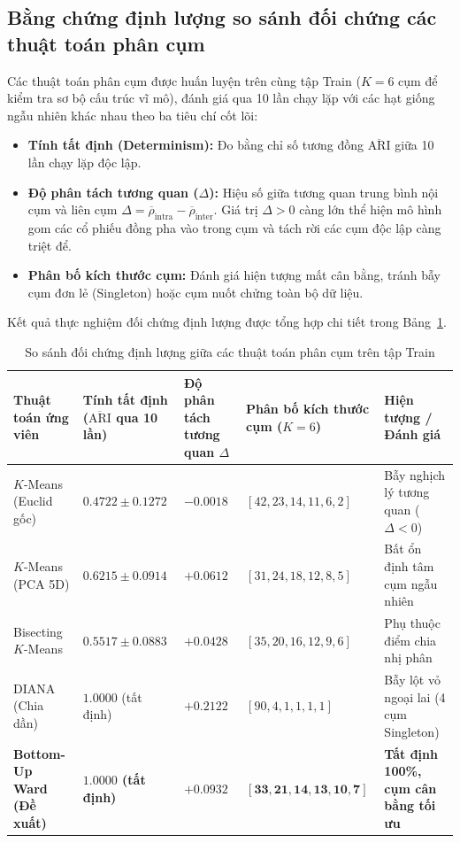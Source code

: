 \documentclass[12pt,a4paper,oneside,openany]{report}
\renewcommand{\arraystretch}{1.25}
\begin{document}
\subsection{Bằng chứng định lượng so sánh đối chứng các thuật toán phân cụm}
Các thuật toán phân cụm được huấn luyện trên cùng tập Train ($K=6$ cụm để kiểm tra sơ bộ cấu trúc vĩ mô), đánh giá qua 10 lần chạy lặp với các hạt giống ngẫu nhiên khác nhau theo ba tiêu chí cốt lõi:
\begin{itemize}
  \item \textbf{Tính tất định (Determinism):} Đo bằng chỉ số tương đồng $\overline{\text{ARI}}$ giữa 10 lần chạy lặp độc lập.
  \item \textbf{Độ phân tách tương quan ($\Delta$):} Hiệu số giữa tương quan trung bình nội cụm và liên cụm $\Delta = \overline{\rho}_{\text{intra}} - \overline{\rho}_{\text{inter}}$. Giá trị $\Delta > 0$ càng lớn thể hiện mô hình gom các cổ phiếu đồng pha vào trong cụm và tách rời các cụm độc lập càng triệt để.
  \item \textbf{Phân bố kích thước cụm:} Đánh giá hiện tượng mất cân bằng, tránh bẫy cụm đơn lẻ (Singleton) hoặc cụm nuốt chửng toàn bộ dữ liệu.
\end{itemize}

Kết quả thực nghiệm đối chứng định lượng được tổng hợp chi tiết trong Bảng~\ref{tab:sosanh_3_truongphai}.

\begingroup
\small
\renewcommand{\arraystretch}{1.2}
\begin{table}[H]
  \centering
  \caption{So sánh đối chứng định lượng giữa các thuật toán phân cụm trên tập Train}
  \label{tab:sosanh_3_truongphai}
  \begin{tabularx}{\textwidth}{|p{3.2cm}|>{\centering\arraybackslash}p{2.2cm}|>{\centering\arraybackslash}p{2.2cm}|X|>{\centering\arraybackslash}p{1.8cm}|}
    \hline
    \rowcolor{black!8}\textbf{Thuật toán ứng viên} & \textbf{Tính tất định ($\overline{\text{ARI}}$ qua 10 lần)} & \textbf{Độ phân tách tương quan $\Delta$} & \textbf{Phân bố kích thước cụm ($K=6$)} & \textbf{Hiện tượng / Đánh giá} \\ \hline
    $K$-Means (Euclid gốc) & $0.4722 \pm 0.1272$ & $-0.0018$ & $[42, 23, 14, 11, 6, 2]$ & Bẫy nghịch lý tương quan ($\Delta < 0$) \\ \hline
    $K$-Means (PCA 5D) & $0.6215 \pm 0.0914$ & $+0.0612$ & $[31, 24, 18, 12, 8, 5]$ & Bất ổn định tâm cụm ngẫu nhiên \\ \hline
    Bisecting $K$-Means & $0.5517 \pm 0.0883$ & $+0.0428$ & $[35, 20, 16, 12, 9, 6]$ & Phụ thuộc điểm chia nhị phân \\ \hline
    DIANA (Chia dần) & $1.0000$ (tất định) & $+0.2122$ & $[90, 4, 1, 1, 1, 1]$ & Bẫy lột vỏ ngoại lai (4 cụm Singleton) \\ \hline
    \textbf{Bottom-Up Ward (Đề xuất)} & \textbf{$1.0000$ (tất định)} & \textbf{$+0.0932$} & $\mathbf{[33, 21, 14, 13, 10, 7]}$ & \textbf{Tất định 100\%, cụm cân bằng tối ưu} \\ \hline
  \end{tabularx}
\end{table}
\endgroup
\end{document}
